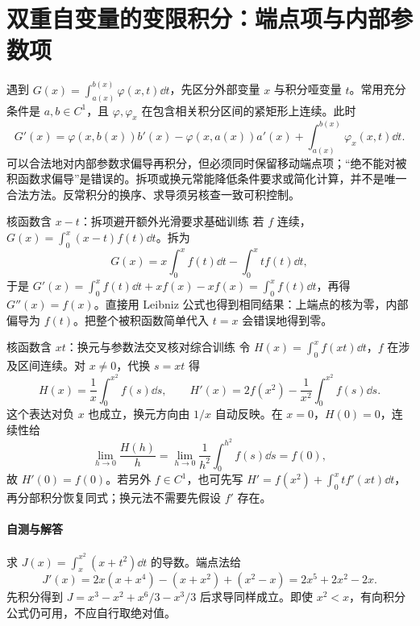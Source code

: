 \section{双重自变量的变限积分：端点项与内部参数项}\label{r2:leibniz}
遇到 $G(x)=\int_{a(x)}^{b(x)}\varphi(x,t)\dd t$，先区分外部变量 $x$ 与积分哑变量 $t$。常用充分条件是 $a,b\in C^1$，且 $\varphi,\varphi_x$ 在包含相关积分区间的紧矩形上连续。此时
\[
 G'(x)=\varphi(x,b(x))b'(x)-\varphi(x,a(x))a'(x)
       +\int_{a(x)}^{b(x)}\varphi_x(x,t)\dd t.
\]
可以合法地对内部参数求偏导再积分，但必须同时保留移动端点项；“绝不能对被积函数求偏导”是错误的。拆项或换元常能降低条件要求或简化计算，并不是唯一合法方法。反常积分的换序、求导须另核查一致可积控制。

\begin{example}{核函数含 $x-t$：拆项避开额外光滑要求}{基础训练}
若 $f$ 连续，$G(x)=\int_0^x(x-t)f(t)\dd t$。拆为
\[
 G(x)=x\int_0^xf(t)\dd t-\int_0^xtf(t)\dd t,
\]
于是 $G'(x)=\int_0^xf(t)\dd t+xf(x)-xf(x)=\int_0^xf(t)\dd t$，再得 $G''(x)=f(x)$。直接用 Leibniz 公式也得到相同结果：上端点的核为零，内部偏导为 $f(t)$。把整个被积函数简单代入 $t=x$ 会错误地得到零。
\end{example}

\begin{example}{核函数含 $xt$：换元与参数法交叉核对}{综合训练}
令 $H(x)=\int_0^x f(xt)\dd t$，$f$ 在涉及区间连续。对 $x\ne0$，代换 $s=xt$ 得
\[
 H(x)=\frac1x\int_0^{x^2}f(s)\dd s,\qquad
 H'(x)=2f(x^2)-\frac1{x^2}\int_0^{x^2}f(s)\dd s.
\]
这个表达对负 $x$ 也成立，换元方向由 $1/x$ 自动反映。在 $x=0$，$H(0)=0$，连续性给
\[
 \lim_{h\to0}\frac{H(h)}h=\lim_{h\to0}\frac1{h^2}\int_0^{h^2}f(s)\dd s=f(0),
\]
故 $H'(0)=f(0)$。若另外 $f\in C^1$，也可先写 $H'=f(x^2)+\int_0^x t f'(xt)\dd t$，再分部积分恢复同式；换元法不需要先假设 $f'$ 存在。
\end{example}

\paragraph{自测与解答}
求 $J(x)=\int_x^{x^2}(x+t^2)\dd t$ 的导数。端点法给
\[
 J'(x)=2x(x+x^4)-(x+x^2)+(x^2-x)
       =2x^5+2x^2-2x.
\]
先积分得到 $J=x^3-x^2+x^6/3-x^3/3$ 后求导同样成立。即使 $x^2<x$，有向积分公式仍可用，不应自行取绝对值。
